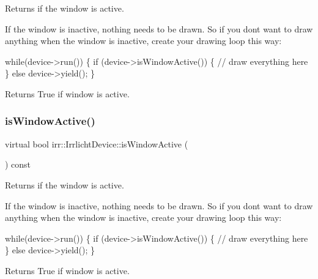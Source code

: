 Returns if the window is active. 

If the window is inactive, nothing needs to be drawn. So if you don\textquotesingle{}t want to draw anything when the window is inactive, create your drawing loop this way\+: 
\begin{DoxyCode}
\textcolor{keywordflow}{while}(device->run())
\{
    \textcolor{keywordflow}{if} (device->isWindowActive())
    \{
        \textcolor{comment}{// draw everything here}
    \}
    \textcolor{keywordflow}{else}
        device->yield();
\}
\end{DoxyCode}
 \begin{DoxyReturn}{Returns}
True if window is active. 
\end{DoxyReturn}
\mbox{\label{classirr_1_1IrrlichtDevice_abd3c88336b739da2694883d5ffd25a70}} 
\subsubsection{\texorpdfstring{is\+Window\+Active()}{isWindowActive()}\hspace{0.1cm}{\footnotesize\ttfamily [2/3]}}
{\footnotesize\ttfamily virtual bool irr\+::\+Irrlicht\+Device\+::is\+Window\+Active (\begin{DoxyParamCaption}{ }\end{DoxyParamCaption}) const\hspace{0.3cm}{\ttfamily [pure virtual]}}



Returns if the window is active. 

If the window is inactive, nothing needs to be drawn. So if you don\textquotesingle{}t want to draw anything when the window is inactive, create your drawing loop this way\+: 
\begin{DoxyCode}
\textcolor{keywordflow}{while}(device->run())
\{
    \textcolor{keywordflow}{if} (device->isWindowActive())
    \{
        \textcolor{comment}{// draw everything here}
    \}
    \textcolor{keywordflow}{else}
        device->yield();
\}
\end{DoxyCode}
 \begin{DoxyReturn}{Returns}
True if window is active. 
\end{DoxyReturn}
\mbox{\label{classirr_1_1IrrlichtDevice_abd3c88336b739da2694883d5ffd25a70}} 

